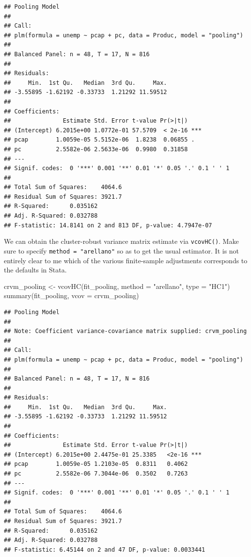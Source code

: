 \documentclass[
  12pt,
  oneside,openany]{book}
\newenvironment{Shaded}{\begin{snugshade}}{\end{snugshade}}
\newcommand{\AttributeTok}[1]{\textcolor[rgb]{0.77,0.63,0.00}{#1}}
\newcommand{\FunctionTok}[1]{\textcolor[rgb]{0.00,0.00,0.00}{#1}}
\newcommand{\NormalTok}[1]{#1}
\newcommand{\OtherTok}[1]{\textcolor[rgb]{0.56,0.35,0.01}{#1}}
\newcommand{\StringTok}[1]{\textcolor[rgb]{0.31,0.60,0.02}{#1}}
\begin{document}
\begin{verbatim}
## Pooling Model
## 
## Call:
## plm(formula = unemp ~ pcap + pc, data = Produc, model = "pooling")
## 
## Balanced Panel: n = 48, T = 17, N = 816
## 
## Residuals:
##     Min.  1st Qu.   Median  3rd Qu.     Max. 
## -3.55895 -1.62192 -0.33733  1.21292 11.59512 
## 
## Coefficients:
##               Estimate Std. Error t-value Pr(>|t|)    
## (Intercept) 6.2015e+00 1.0772e-01 57.5709  < 2e-16 ***
## pcap        1.0059e-05 5.5152e-06  1.8238  0.06855 .  
## pc          2.5582e-06 2.5633e-06  0.9980  0.31858    
## ---
## Signif. codes:  0 '***' 0.001 '**' 0.01 '*' 0.05 '.' 0.1 ' ' 1
## 
## Total Sum of Squares:    4064.6
## Residual Sum of Squares: 3921.7
## R-Squared:      0.035162
## Adj. R-Squared: 0.032788
## F-statistic: 14.8141 on 2 and 813 DF, p-value: 4.7947e-07
\end{verbatim}

We can obtain the cluster-robust variance matrix estimate via \texttt{vcovHC()}. Make sure to specify \texttt{method\ =\ "arellano"} so as to get the usual estimator. It is not entirely clear to me which of the various finite-sample adjustments corresponds to the defaults in Stata.

\begin{Shaded}
\begin{Highlighting}[]
\NormalTok{crvm\_pooling }\OtherTok{\textless{}{-}} \FunctionTok{vcovHC}\NormalTok{(fit\_pooling,}
                       \AttributeTok{method =} \StringTok{"arellano"}\NormalTok{,}
                       \AttributeTok{type =} \StringTok{"HC1"}\NormalTok{)}
\FunctionTok{summary}\NormalTok{(fit\_pooling, }\AttributeTok{vcov =}\NormalTok{ crvm\_pooling)}
\end{Highlighting}
\end{Shaded}

\begin{verbatim}
## Pooling Model
## 
## Note: Coefficient variance-covariance matrix supplied: crvm_pooling
## 
## Call:
## plm(formula = unemp ~ pcap + pc, data = Produc, model = "pooling")
## 
## Balanced Panel: n = 48, T = 17, N = 816
## 
## Residuals:
##     Min.  1st Qu.   Median  3rd Qu.     Max. 
## -3.55895 -1.62192 -0.33733  1.21292 11.59512 
## 
## Coefficients:
##               Estimate Std. Error t-value Pr(>|t|)    
## (Intercept) 6.2015e+00 2.4475e-01 25.3385   <2e-16 ***
## pcap        1.0059e-05 1.2103e-05  0.8311   0.4062    
## pc          2.5582e-06 7.3044e-06  0.3502   0.7263    
## ---
## Signif. codes:  0 '***' 0.001 '**' 0.01 '*' 0.05 '.' 0.1 ' ' 1
## 
## Total Sum of Squares:    4064.6
## Residual Sum of Squares: 3921.7
## R-Squared:      0.035162
## Adj. R-Squared: 0.032788
## F-statistic: 6.45144 on 2 and 47 DF, p-value: 0.0033441
\end{verbatim}
\end{document}
